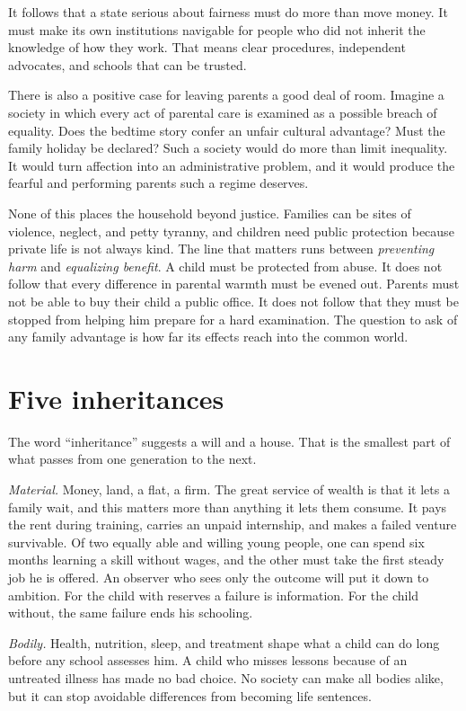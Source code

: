 \documentclass[12pt,a4paper]{book}
\begin{document}
It follows that a state serious about fairness must do more than move money. It must make its own institutions navigable for people who did not inherit the knowledge of how they work. That means clear procedures, independent advocates, and schools that can be trusted.

There is also a positive case for leaving parents a good deal of room. Imagine a society in which every act of parental care is examined as a possible breach of equality. Does the bedtime story confer an unfair cultural advantage? Must the family holiday be declared? Such a society would do more than limit inequality. It would turn affection into an administrative problem, and it would produce the fearful and performing parents such a regime deserves.

None of this places the household beyond justice. Families can be sites of violence, neglect, and petty tyranny, and children need public protection because private life is not always kind. The line that matters runs between \emph{preventing harm} and \emph{equalizing benefit}. A child must be protected from abuse. It does not follow that every difference in parental warmth must be evened out. Parents must not be able to buy their child a public office. It does not follow that they must be stopped from helping him prepare for a hard examination. The question to ask of any family advantage is how far its effects reach into the common world.

\section{Five inheritances}

The word ``inheritance'' suggests a will and a house. That is the smallest part of what passes from one generation to the next.

\emph{Material.} Money, land, a flat, a firm. The great service of wealth is that it lets a family wait, and this matters more than anything it lets them consume. It pays the rent during training, carries an unpaid internship, and makes a failed venture survivable. Of two equally able and willing young people, one can spend six months learning a skill without wages, and the other must take the first steady job he is offered. An observer who sees only the outcome will put it down to ambition. For the child with reserves a failure is information. For the child without, the same failure ends his schooling.

\emph{Bodily.} Health, nutrition, sleep, and treatment shape what a child can do long before any school assesses him. A child who misses lessons because of an untreated illness has made no bad choice. No society can make all bodies alike, but it can stop avoidable differences from becoming life sentences.
\end{document}
